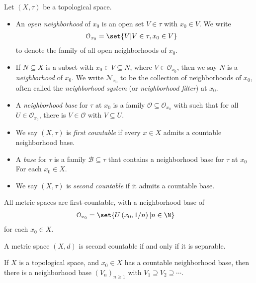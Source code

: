 \begin{definition}\label{def:neighborhoods_and_bases}
  Let $\left(X,\tau\right)$ be a topological space.
  \begin{itemize}
    \item An \textit{open neighborhood} of $x_0$ is an open set $V\in \tau$ with $x_0\in V$. We write
      \begin{align*}
        \mathcal{O}_{x_0} &= \set{V | V\in \tau,x_0\in V}
      \end{align*}
      to denote the family of all open neighborhoods of $x_0$.
    \item If $N\subseteq X$ is a subset with $x_0\in V\subseteq N$, where $V\in \mathcal{O}_{x_0}$, then we say $N$ is a \textit{neighborhood} of $x_0$. We write $\mathcal{N}_{x_0}$ to be the collection of neighborhoods of $x_0$, often called the \textit{neighborhood system} (or \textit{neighborhood filter}) at $x_0$.
    \item A \textit{neighborhood base} for $\tau$ at $x_0$ is a family $\mathcal{O}\subseteq \mathcal{O}_{x_0}$ with such that for all $U\in \mathcal{O}_{x_0}$, there is $V\in \mathcal{O}$ with $V \subseteq U$.
    \item We say $\left(X,\tau\right)$ is \textit{first countable} if every $x\in X$ admits a countable neighborhood base.
    \item A \textit{base} for $\tau$ is a family $\mathcal{B}\subseteq \tau$ that contains a neighborhood base for $\tau$ at $x_0$ For each $x_0\in X$.
    \item We say $\left(X,\tau\right)$ is \textit{second countable} if it admits a countable base.
  \end{itemize}
\end{definition}
\begin{fact}
  All metric spaces are first-countable, with a neighborhood base of
  \begin{align*}
    \mathcal{O}_{x_0} &= \set{U\left(x_0,1/n\right)|n\in \N}
  \end{align*}
  for each $x_0\in X$.\newline

  A metric space $\left(X,d\right)$ is second countable if and only if it is separable.
\end{fact}
\begin{fact}
  If $X$ is a topological space, and $x_0\in X$ has a countable neighborhood base, then there is a neighborhood base $\left(V_n\right)_{n\geq 1}$ with $V_1\supseteq V_2\supseteq \cdots$.
\end{fact}
